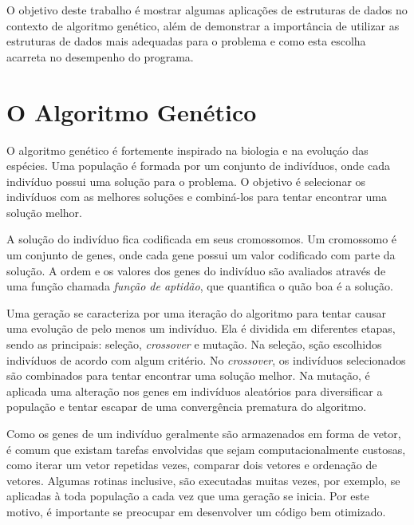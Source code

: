 \documentclass[12pt]{article}
\begin{document}
O objetivo deste trabalho \'{e} mostrar algumas aplica\c{c}\~{o}es de estruturas de dados no contexto de
algoritmo gen\'{e}tico, al\'{e}m de demonstrar a import\^{a}ncia de utilizar as estruturas de dados
mais adequadas para o problema e como esta escolha acarreta no desempenho do programa.

\section{O Algoritmo Gen\'{e}tico}

O algoritmo gen\'{e}tico \'{e} fortemente inspirado na biologia e na evolu\c{c}\'{a}o das esp\'{e}cies.
Uma popula\c{c}\~{a}o \'{e} formada por um conjunto de indiv\'{i}duos, onde cada indiv\'{i}duo possui uma
solu\c{c}\~{a}o para o problema. O objetivo \'{e} selecionar os indiv\'{i}duos com as melhores
solu\c{c}\~{o}es e combin\'{a}-los para tentar encontrar uma solu\c{c}\~{a}o melhor.

A solu\c{c}\~{a}o do indiv\'{i}duo fica codificada em seus cromossomos. Um cromossomo \'{e} um conjunto de genes,
onde cada gene possui um valor codificado com parte da solu\c{c}\~{a}o. A ordem e os valores dos genes do
indiv\'{i}duo s\~{a}o avaliados atrav\'{e}s de uma fun\c{c}\~{a}o chamada \textit{fun\c{c}\~{a}o de aptid\~{a}o}, que
quantifica o qu\~{a}o boa \'{e} a solu\c{c}\~{a}o.

Uma gera\c{c}\~{a}o se caracteriza por uma itera\c{c}\~{a}o do algoritmo para tentar causar uma evolu\c{c}\~{a}o de
pelo menos um indiv\'{i}duo. Ela \'{e} dividida em diferentes etapas, sendo as principais: sele\c{c}\~{a}o,
\textit{crossover} e muta\c{c}\~{a}o. Na sele\c{c}\~{a}o, s\c{c}\~{a}o escolhidos indiv\'{i}duos de acordo com algum
crit\'{e}rio. No \textit{crossover}, os indiv\'{i}duos selecionados s\~{a}o combinados para tentar encontrar
uma solu\c{c}\~{a}o melhor. Na muta\c{c}\~{a}o, \'{e} aplicada uma altera\c{c}\~{a}o nos genes em indiv\'{i}duos
aleat\'{o}rios para diversificar a popula\c{c}\~{a}o e tentar escapar de uma converg\^{e}ncia prematura do algoritmo.

Como os genes de um indiv\'{i}duo geralmente s\~{a}o armazenados em forma de vetor, \'{e} comum
que existam tarefas envolvidas que sejam computacionalmente custosas, como iterar um vetor repetidas
vezes, comparar dois vetores e ordena\c{c}\~{a}o de vetores. Algumas rotinas inclusive, s\~{a}o executadas muitas
vezes, por exemplo, se aplicadas \`{a} toda popula\c{c}\~{a}o a cada vez que uma gera\c{c}\~{a}o se inicia. Por este motivo,
\'{e} importante se preocupar em desenvolver um c\'{o}digo bem otimizado.
\end{document}
